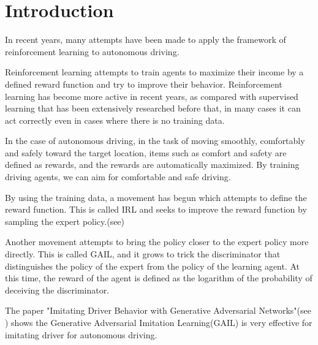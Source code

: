 \chapter{Introduction}

In recent years, many attempts have been made to apply the framework of reinforcement learning to autonomous driving.



Reinforcement learning attempts to train agents to maximize their income by a defined reward function and try to improve their behavior.
Reinforcement learning has become more active in recent years, as compared with supervised learning that has been extensively researched before that, in many cases it can act correctly even in cases where there is no training data.

In the case of autonomous driving, in the task of moving smoothly, comfortably and safely toward the target location, items such as comfort and safety are defined as rewards, and the rewards are automatically maximized. By training driving agents, we can aim for comfortable and safe driving.

By using the training data, a movement has begun which attempts to define the reward function. This is called IRL and seeks to improve the reward function by sampling the expert policy.(see\cite{kuderer2015learning})

Another movement attempts to bring the policy closer to the expert policy more directly. This is called GAIL, and it grows to trick the discriminator that distinguishes the policy of the expert from the policy of the learning agent.
At this time, the reward of the agent is defined as the logarithm of the probability of deceiving the discriminator.

The paper "Imitating Driver Behavior with Generative Adversarial Networks"(see \cite{DBLP:journals/corr/KueflerMWK17}) shows  
the Generative Adversarial Imitation Learning(GAIL) is very effective for imitating driver for autonomous driving.

